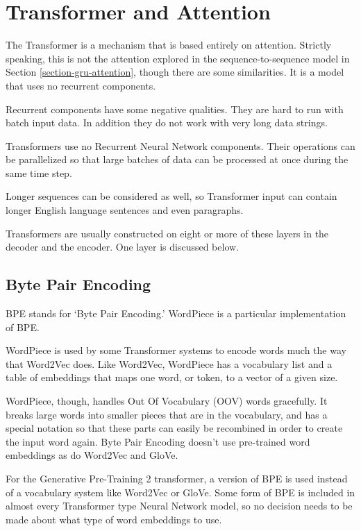 
\section{Transformer and Attention}

\label{transformer-intro}

The Transformer is a mechanism that is based entirely on attention. Strictly speaking, this is not the attention explored in the sequence-to-sequence model in Section \ref{section-gru-attention}, though there are some similarities. It is a model that uses no recurrent components.

Recurrent components have some negative qualities. They are hard to run with batch input data. In addition they do not work with very long data strings. 


Transformers use no Recurrent Neural Network components. Their operations can be parallelized so that large batches of data can be processed at once during the same time step. 

Longer sequences can be considered as well, so Transformer input can contain longer English language sentences and even paragraphs. 

Transformers are usually constructed on eight or more of these layers in the decoder and the encoder. One layer is discussed below.

\subsection{Byte Pair Encoding}

\ac{BPE} stands for `Byte Pair Encoding.' WordPiece is a particular implementation of BPE.

WordPiece is used by some Transformer systems to encode words much the way that Word2Vec does. Like Word2Vec, WordPiece  has a vocabulary list and a table of embeddings that maps one word, or token, to a vector of a given size.

WordPiece, though, handles Out Of Vocabulary (\ac{OOV}) words gracefully. It breaks large words into smaller pieces that are in the vocabulary, and has a special notation so that these parts can easily be recombined in order to create the input word again. Byte Pair Encoding doesn't use pre-trained word embeddings as do Word2Vec and GloVe.

For the Generative Pre-Training 2 transformer, a version of BPE is used instead of a vocabulary system like Word2Vec or GloVe. Some form of BPE is included in almost every Transformer type Neural Network model, so no decision needs to be made about what type of word embeddings to use.

